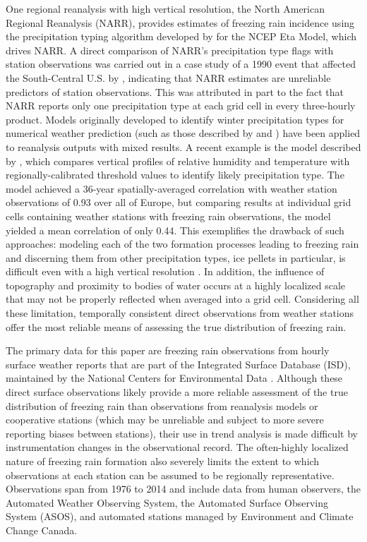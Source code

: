 \documentclass[twocol]{ametsoc}
\begin{document}
One regional reanalysis with high vertical resolution, the North American Regional Reanalysis (NARR), provides estimates of freezing rain incidence using the precipitation typing algorithm developed by \citet{baldwin1993development} for the NCEP Eta Model, which drives NARR. A direct comparison of NARR's precipitation type flags with station observations was carried out in a case study of a 1990 event that affected the South-Central U.S. by \citet{blunden2011138}, indicating that NARR estimates are unreliable predictors of station observations. This was attributed in part to the fact that NARR reports only one precipitation type at each grid cell in every three-hourly product. Models originally developed to identify winter precipitation types for numerical weather prediction (such as those described by \citet{cortinas2002probabilistic} and \citet{mullens2017multialgorithm}) have been applied to reanalysis outputs with mixed results. A recent example is the model described by \citet{kamarainen2017method}, which compares vertical profiles of relative humidity and temperature with regionally-calibrated threshold values to identify likely precipitation type. The model achieved a 36-year spatially-averaged correlation with weather station observations of 0.93 over all of Europe, but comparing results at individual grid cells containing weather stations with freezing rain observations, the model yielded a mean correlation of only 0.44. This exemplifies the drawback of such approaches: modeling each of the two formation processes leading to freezing rain and discerning them from other precipitation types, ice pellets in particular, is difficult even with a high vertical resolution \citep{reeves2014sources}. In addition, the influence of topography and proximity to bodies of water occurs at a highly localized scale that may not be properly reflected when averaged into a grid cell. Considering all these limitation, temporally consistent direct observations from weather stations offer the most reliable means of assessing the true distribution of freezing rain.

The primary data for this paper are freezing rain observations from hourly surface weather reports that are part of the Integrated Surface Database (ISD), maintained by the National Centers for Environmental Data \citep{smith2011integrated}. Although these direct surface observations likely provide a more reliable assessment of the true distribution of freezing rain than observations from reanalysis models or cooperative stations (which may be unreliable and subject to more severe reporting biases between stations), their use in trend analysis is made difficult by instrumentation changes in the observational record. The often-highly localized nature of freezing rain formation also severely limits the extent to which observations at each station can be assumed to be regionally representative. Observations span from 1976 to 2014 and include data from human observers, the Automated Weather Observing System, the Automated Surface Observing System (ASOS), and automated stations managed by Environment and Climate Change Canada.
\end{document}
